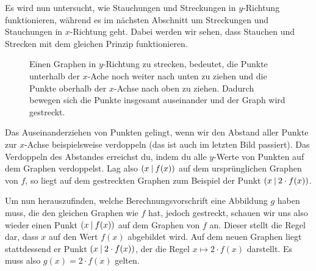 \documentclass[../../main.tex]{subfiles}
\begin{document}
Es wird nun untersucht, wie Stauchungen und Streckungen in $y$-Richtung funktionieren, während es im nächsten Abschnitt um Streckungen und Stauchungen in $x$-Richtung geht. Dabei werden wir sehen, dass Stauchen und Strecken mit dem gleichen Prinzip funktionieren.


\begin{figure}[ht]
    \centering
    \caption{Einen Graphen in $y$-Richtung zu strecken, bedeutet, die Punkte unterhalb der $x$-Ache noch weiter nach unten zu ziehen und die Punkte oberhalb der $x$-Achse nach oben zu ziehen. Dadurch bewegen sich die Punkte insgesamt auseinander und der Graph wird gestreckt.}
\end{figure}

Das Auseinanderziehen von Punkten gelingt, wenn wir den Abstand aller Punkte zur $x$-Achse beispielsweise verdoppeln (das ist auch im letzten Bild passiert). Das Verdoppeln des Abstandes erreichst du, indem du alle $y$-Werte von Punkten auf dem Graphen verdoppelst. Lag also $\left(x \:\middle|\: f(x)\right)$ auf dem ursprünglichen Graphen von $f$, so liegt auf dem gestreckten Graphen zum Beispiel der Punkt $\left(x \:\middle|\: 2\cdot f(x)\right)$.

Um nun herauszufinden, welche Berechnungsvorschrift eine Abbildung $g$ haben muss, die den gleichen Graphen wie $f$ hat, jedoch gestreckt, schauen wir uns also wieder einen Punkt $\left(x \:\middle|\: f(x)\right)$ auf dem Graphen von $f$ an. Dieser stellt die Regel dar, dass $x$ auf den Wert $f(x)$ abgebildet wird. Auf dem neuen Graphen liegt stattdessend er Punkt $\left(x \:\middle|\: 2\cdot f(x)\right)$, der die Regel $x\mapsto 2\cdot f(x)$ darstellt. Es muss also $g(x)=2\cdot f(x)$ gelten.
\end{document}
